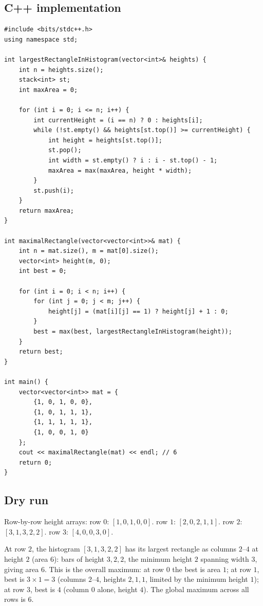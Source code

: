 \subsection*{C++ implementation}

\begin{lstlisting}
#include <bits/stdc++.h>
using namespace std;

int largestRectangleInHistogram(vector<int>& heights) {
    int n = heights.size();
    stack<int> st;
    int maxArea = 0;

    for (int i = 0; i <= n; i++) {
        int currentHeight = (i == n) ? 0 : heights[i];
        while (!st.empty() && heights[st.top()] >= currentHeight) {
            int height = heights[st.top()];
            st.pop();
            int width = st.empty() ? i : i - st.top() - 1;
            maxArea = max(maxArea, height * width);
        }
        st.push(i);
    }
    return maxArea;
}

int maximalRectangle(vector<vector<int>>& mat) {
    int n = mat.size(), m = mat[0].size();
    vector<int> height(m, 0);
    int best = 0;

    for (int i = 0; i < n; i++) {
        for (int j = 0; j < m; j++) {
            height[j] = (mat[i][j] == 1) ? height[j] + 1 : 0;
        }
        best = max(best, largestRectangleInHistogram(height));
    }
    return best;
}

int main() {
    vector<vector<int>> mat = {
        {1, 0, 1, 0, 0},
        {1, 0, 1, 1, 1},
        {1, 1, 1, 1, 1},
        {1, 0, 0, 1, 0}
    };
    cout << maximalRectangle(mat) << endl; // 6
    return 0;
}
\end{lstlisting}

\subsection*{Dry run}


Row-by-row height arrays: row $0$: $[1,0,1,0,0]$. row $1$:
$[2,0,2,1,1]$. row $2$: $[3,1,3,2,2]$. row $3$: $[4,0,0,3,0]$.

At row $2$, the histogram $[3,1,3,2,2]$ has its largest rectangle as
columns $2$--$4$ at height $2$ (area $6$): bars of height $3,2,2$, the
minimum height $2$ spanning width $3$, giving area $6$. This is the overall maximum: at row $0$ the best is area $1$; at row
$1$, best is $3\times1=3$ (columns $2$--$4$, heights $2,1,1$, limited
by the minimum height $1$); at row $3$, best is $4$ (column $0$ alone,
height $4$). The global maximum across all rows is $6$.

